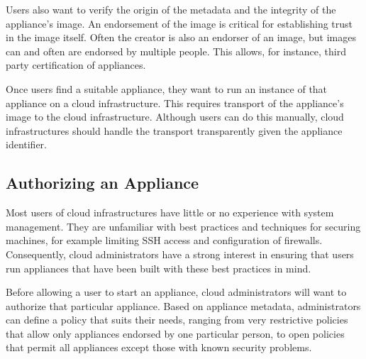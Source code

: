 Users also want to verify the origin of the metadata and the integrity
of the appliance's image.  An endorsement of the image is critical for
establishing trust in the image itself.  Often the creator is also an
endorser of an image, but images can and often are endorsed by
multiple people.  This allows, for instance, third party certification
of appliances.

Once users find a suitable appliance, they want to run an instance of
that appliance on a cloud infrastructure.  This requires transport of
the appliance's image to the cloud infrastructure.  Although users
can do this manually, cloud infrastructures should handle
the transport transparently given the appliance identifier.

\subsection{Authorizing an Appliance}

Most users of cloud infrastructures have little or no experience with
system management.  They are unfamiliar with best practices and
techniques for securing machines, for example limiting SSH access and
configuration of firewalls.  Consequently, cloud administrators have a
strong interest in ensuring that users run appliances that have been
built with these best practices in mind.

Before allowing a user to start an appliance, cloud administrators
will want to authorize that particular appliance.  Based on appliance
metadata, administrators can define a policy that suits their needs,
ranging from very restrictive policies that allow only appliances endorsed by
one particular person, to open policies that permit all 
appliances except those with known security problems.
